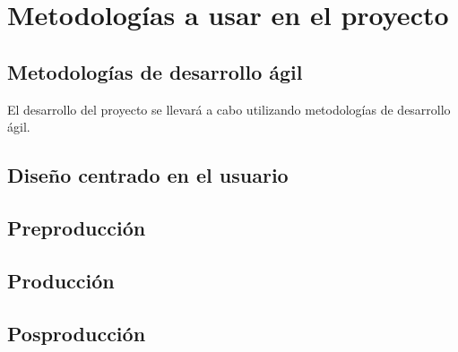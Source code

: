 \chapter{Metodologías a usar en el proyecto}
\label{ch:metodologias}

\section{Metodologías de desarrollo ágil}
El desarrollo del proyecto se llevará a cabo utilizando metodologías de desarrollo ágil.

\section{Diseño centrado en el usuario}

\section{Preproducción}

\section{Producción}

\section{Posproducción}
